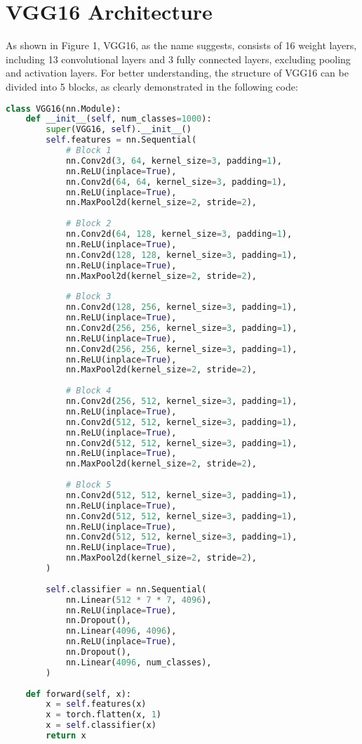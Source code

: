 \documentclass{rapportECL}
\begin{document}
\section{VGG16 Architecture}
As shown in Figure 1, VGG16, as the name suggests, consists of 16 weight layers, including 13 convolutional layers and 3 fully connected layers, excluding pooling and activation layers. For better understanding, the structure of VGG16 can be divided into 5 blocks, as clearly demonstrated in the following code:
\begin{lstlisting}[language=Python]
class VGG16(nn.Module):
    def __init__(self, num_classes=1000):
        super(VGG16, self).__init__()
        self.features = nn.Sequential(
            # Block 1
            nn.Conv2d(3, 64, kernel_size=3, padding=1),
            nn.ReLU(inplace=True),
            nn.Conv2d(64, 64, kernel_size=3, padding=1),
            nn.ReLU(inplace=True),
            nn.MaxPool2d(kernel_size=2, stride=2),
            
            # Block 2
            nn.Conv2d(64, 128, kernel_size=3, padding=1),
            nn.ReLU(inplace=True),
            nn.Conv2d(128, 128, kernel_size=3, padding=1),
            nn.ReLU(inplace=True),
            nn.MaxPool2d(kernel_size=2, stride=2),
            
            # Block 3
            nn.Conv2d(128, 256, kernel_size=3, padding=1),
            nn.ReLU(inplace=True),
            nn.Conv2d(256, 256, kernel_size=3, padding=1),
            nn.ReLU(inplace=True),
            nn.Conv2d(256, 256, kernel_size=3, padding=1),
            nn.ReLU(inplace=True),
            nn.MaxPool2d(kernel_size=2, stride=2),
            
            # Block 4
            nn.Conv2d(256, 512, kernel_size=3, padding=1),
            nn.ReLU(inplace=True),
            nn.Conv2d(512, 512, kernel_size=3, padding=1),
            nn.ReLU(inplace=True),
            nn.Conv2d(512, 512, kernel_size=3, padding=1),
            nn.ReLU(inplace=True),
            nn.MaxPool2d(kernel_size=2, stride=2),
            
            # Block 5
            nn.Conv2d(512, 512, kernel_size=3, padding=1),
            nn.ReLU(inplace=True),
            nn.Conv2d(512, 512, kernel_size=3, padding=1),
            nn.ReLU(inplace=True),
            nn.Conv2d(512, 512, kernel_size=3, padding=1),
            nn.ReLU(inplace=True),
            nn.MaxPool2d(kernel_size=2, stride=2),
        )
        
        self.classifier = nn.Sequential(
            nn.Linear(512 * 7 * 7, 4096),
            nn.ReLU(inplace=True),
            nn.Dropout(),
            nn.Linear(4096, 4096),
            nn.ReLU(inplace=True),
            nn.Dropout(),
            nn.Linear(4096, num_classes),
        )
    
    def forward(self, x):
        x = self.features(x)
        x = torch.flatten(x, 1)
        x = self.classifier(x)
        return x
\end{lstlisting}
\end{document}
